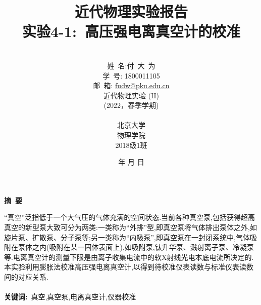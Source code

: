 \documentclass[a4paper]{article}
\begin{document}
\renewcommand{\contentsname}{目\ 录}
\renewcommand{\appendixname}{附录}
\renewcommand{\appendixpagename}{附录}
\renewcommand{\refname}{参考文献} 
\renewcommand{\figurename}{图}
\renewcommand{\tablename}{表}
\renewcommand{\today}{\number\year 年 \number\month 月 \number\day 日}
\newcommand{\refeq}[1]{\textbf{Eq.(\ref{#1})}}
\newcommand*{\circled}[1]{\lower.7ex\hbox{\tikz\draw (0pt, 0pt)%
    circle (.5em) node {\makebox[1em][c]{\small #1}};}}
    
\title{{\Huge 近代物理实验报告{\large\linebreak\\}}{\Large 实验4-1:\ 高压强电离真空计的校准\linebreak\linebreak}}
\author{\\姓\ 名:付\ 大\ 为\\
学\ 号: 1800011105\\
邮\ 箱: \url{fudw@pku.edu.cn}\\
近代物理实验 (II)\\
(2022，春季学期)\\\\
北京大学\\
物理学院\\
2018级1班}
\date{\today}
\maketitle
\newpage

\begin{center}
{\Large\bf{摘\ 要\\}}
\end{center}

“真空”泛指低于一个大气压的气体充满的空间状态.当前各种真空泵,包括获得超高真空的新型泵大致可分为两类:一类称为“外排”型,即真空泵将气体排出泵体之外,如旋片泵、扩散泵、分子泵等;另一类称为“内吸泵”,即真空泵在一封闭系统中,气体吸附在泵体之内(吸附在某一固体表面上),如吸附泵,钛升华泵、溅射离子泵、冷凝泵等.电离真空计的测量下限是由离子收集电流中的软X射线光电本底电流所决定的.本实验利用膨胀法校准高压强电离真空计,以得到待校准仪表读数与标准仪表读数间的对应关系.
\\\\
{\bf{关键词}:}\ 真空,真空泵,电离真空计,仪器校准
\end{document}
